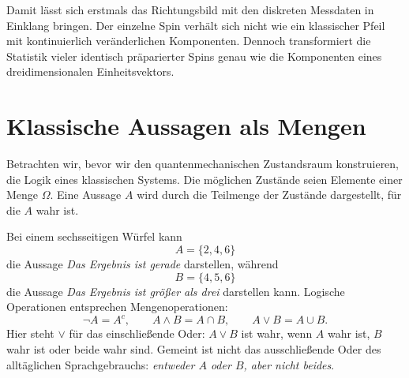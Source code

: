 \begin{classroomqa}
\end{classroomqa}

\begin{classroomqa}
\end{classroomqa}

Damit lässt sich erstmals das Richtungsbild mit den diskreten Messdaten in Einklang bringen. Der einzelne Spin verhält sich nicht wie ein klassischer Pfeil mit kontinuierlich veränderlichen Komponenten. Dennoch transformiert die Statistik vieler identisch präparierter Spins genau wie die Komponenten eines dreidimensionalen Einheitsvektors.

\section{Klassische Aussagen als Mengen}

Betrachten wir, bevor wir den quantenmechanischen Zustandsraum konstruieren, die Logik eines klassischen Systems. Die möglichen Zustände seien Elemente einer Menge \(\Omega\). Eine Aussage \(A\) wird durch die Teilmenge der Zustände dargestellt, für die \(A\) wahr ist.

Bei einem sechsseitigen Würfel kann
\[
A=\{2,4,6\}
\]
die Aussage \emph{Das Ergebnis ist gerade} darstellen, während
\[
B=\{4,5,6\}
\]
die Aussage \emph{Das Ergebnis ist größer als drei} darstellen kann. Logische Operationen entsprechen Mengenoperationen:
\begin{equation}
\neg A=A^c,\qquad
A\land B=A\cap B,\qquad
A\lor B=A\cup B.
\label{eq:classical-logic}
\end{equation}
Hier steht \(\lor\) für das einschließende Oder: \(A\lor B\) ist wahr, wenn \(A\) wahr ist, \(B\) wahr ist oder beide wahr sind. Gemeint ist nicht das ausschließende Oder des alltäglichen Sprachgebrauchs: \emph{entweder \(A\) oder \(B\), aber nicht beides}.

